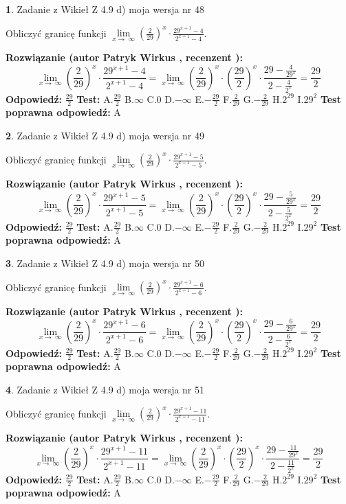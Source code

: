 \documentclass[12pt, a4paper]{article}
\theoremstyle{definition} %
\newtheorem{zad}{}
\newcommand{\zadStart}[1]{\begin{zad}#1\newline}
\newcommand{\zadStop}{\end{zad}}
\newcommand{\rozwStart}[2]{\noindent \textbf{Rozwiązanie (autor #1 , recenzent #2): }\newline}
\newcommand{\rozwStop}{\newline}
\newcommand{\odpStart}{\noindent \textbf{Odpowiedź:}\newline}
\newcommand{\odpStop}{\newline}
\newcommand{\testStart}{\noindent \textbf{Test:}\newline}
\newcommand{\testStop}{\newline}
\newcommand{\kluczStart}{\noindent \textbf{Test poprawna odpowiedź:}\newline}
\newcommand{\kluczStop}{\newline}
\begin{document}
\zadStart{Zadanie z Wikieł Z 4.9 d) moja wersja nr 48}


Obliczyć granicę funkcji  $\lim\limits_{x\to\ \infty}(\frac{2}{29})^{x}\cdot\frac{29^{x+1}-4}{2^{x+1}-4}$.
\zadStop
\rozwStart{Patryk Wirkus}{}
$$\lim\limits_{x\to\ \infty}(\frac{2}{29})^{x}\cdot\frac{29^{x+1}-4}{2^{x+1}-4}=\lim\limits_{x\to\ \infty}(\frac{2}{29})^{x}\cdot(\frac{29}{2})^{x} \cdot \frac{29-\frac{4}{29^{x}}}{2-\frac{4}{2^{x}}} = \frac{29}{2}$$
\rozwStop
\odpStart
$\frac{29}{2}$
\odpStop
\testStart
A.$\frac{29}{2}$ B.$\infty$ C.$0$ D.$-\infty$ E.$-\frac{29}{2}$
F.$\frac{2}{29}$ G.$-\frac{2}{29}$
H.$2^{29}$
I.$29^{2}$
\testStop
\kluczStart
A
\kluczStop



\zadStart{Zadanie z Wikieł Z 4.9 d) moja wersja nr 49}


Obliczyć granicę funkcji  $\lim\limits_{x\to\ \infty}(\frac{2}{29})^{x}\cdot\frac{29^{x+1}-5}{2^{x+1}-5}$.
\zadStop
\rozwStart{Patryk Wirkus}{}
$$\lim\limits_{x\to\ \infty}(\frac{2}{29})^{x}\cdot\frac{29^{x+1}-5}{2^{x+1}-5}=\lim\limits_{x\to\ \infty}(\frac{2}{29})^{x}\cdot(\frac{29}{2})^{x} \cdot \frac{29-\frac{5}{29^{x}}}{2-\frac{5}{2^{x}}} = \frac{29}{2}$$
\rozwStop
\odpStart
$\frac{29}{2}$
\odpStop
\testStart
A.$\frac{29}{2}$ B.$\infty$ C.$0$ D.$-\infty$ E.$-\frac{29}{2}$
F.$\frac{2}{29}$ G.$-\frac{2}{29}$
H.$2^{29}$
I.$29^{2}$
\testStop
\kluczStart
A
\kluczStop



\zadStart{Zadanie z Wikieł Z 4.9 d) moja wersja nr 50}


Obliczyć granicę funkcji  $\lim\limits_{x\to\ \infty}(\frac{2}{29})^{x}\cdot\frac{29^{x+1}-6}{2^{x+1}-6}$.
\zadStop
\rozwStart{Patryk Wirkus}{}
$$\lim\limits_{x\to\ \infty}(\frac{2}{29})^{x}\cdot\frac{29^{x+1}-6}{2^{x+1}-6}=\lim\limits_{x\to\ \infty}(\frac{2}{29})^{x}\cdot(\frac{29}{2})^{x} \cdot \frac{29-\frac{6}{29^{x}}}{2-\frac{6}{2^{x}}} = \frac{29}{2}$$
\rozwStop
\odpStart
$\frac{29}{2}$
\odpStop
\testStart
A.$\frac{29}{2}$ B.$\infty$ C.$0$ D.$-\infty$ E.$-\frac{29}{2}$
F.$\frac{2}{29}$ G.$-\frac{2}{29}$
H.$2^{29}$
I.$29^{2}$
\testStop
\kluczStart
A
\kluczStop



\zadStart{Zadanie z Wikieł Z 4.9 d) moja wersja nr 51}


Obliczyć granicę funkcji  $\lim\limits_{x\to\ \infty}(\frac{2}{29})^{x}\cdot\frac{29^{x+1}-11}{2^{x+1}-11}$.
\zadStop
\rozwStart{Patryk Wirkus}{}
$$\lim\limits_{x\to\ \infty}(\frac{2}{29})^{x}\cdot\frac{29^{x+1}-11}{2^{x+1}-11}=\lim\limits_{x\to\ \infty}(\frac{2}{29})^{x}\cdot(\frac{29}{2})^{x} \cdot \frac{29-\frac{11}{29^{x}}}{2-\frac{11}{2^{x}}} = \frac{29}{2}$$
\rozwStop
\odpStart
$\frac{29}{2}$
\odpStop
\testStart
A.$\frac{29}{2}$ B.$\infty$ C.$0$ D.$-\infty$ E.$-\frac{29}{2}$
F.$\frac{2}{29}$ G.$-\frac{2}{29}$
H.$2^{29}$
I.$29^{2}$
\testStop
\kluczStart
A
\kluczStop
\end{document}
